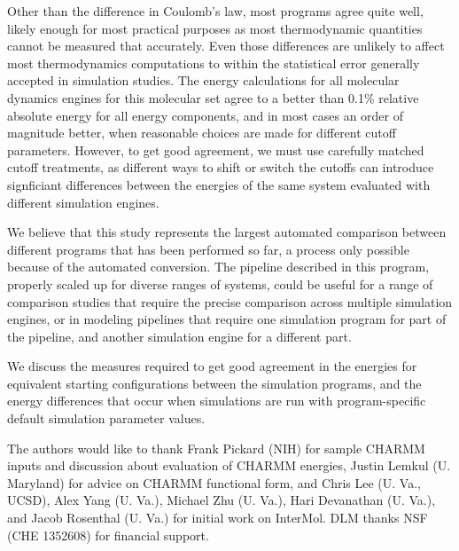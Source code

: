 Other than the difference in Coulomb's law, most programs agree quite
well, likely enough for most practical purposes as most thermodynamic
quantities cannot be measured that accurately.  Even those differences
are unlikely to affect most thermodynamics computations to within the
statistical error generally accepted in simulation studies. The energy
calculations for all molecular dynamics engines for this molecular set
agree to a better than 0.1\% relative absolute energy for all energy
components, and in most cases an order of magnitude better, when
reasonable choices are made for different cutoff parameters. However,
to get good agreement, we must use carefully matched cutoff
treatments, as different ways to shift or switch the cutoffs can
introduce signficiant differences between the energies of the same
system evaluated with different simulation engines.

We believe that this study represents the largest automated comparison
between different programs that has been performed so far, a process
only possible because of the automated conversion. The pipeline
described in this program, properly scaled up for diverse ranges of
systems, could be useful for a range of comparison studies that
require the precise comparison across multiple simulation engines, or
in modeling pipelines that require one simulation program for part of
the pipeline, and another simulation engine for a different part.

We discuss the measures required
to get good agreement in the energies for equivalent starting
configurations between the simulation programs, and the energy
differences that occur when simulations are run with program-specific
default simulation parameter values.

\begin{acknowledgements}
The authors would like to thank Frank Pickard (NIH) for sample CHARMM
inputs and discussion about evaluation of CHARMM energies, Justin
Lemkul (U. Maryland) for advice on CHARMM functional form, and Chris
Lee (U. Va., UCSD), Alex Yang (U. Va.), Michael Zhu (U. Va.), Hari
Devanathan (U. Va.), and Jacob Rosenthal (U. Va.)  for initial work on
InterMol. DLM thanks NSF (CHE 1352608) for financial support.
\end{acknowledgements}



